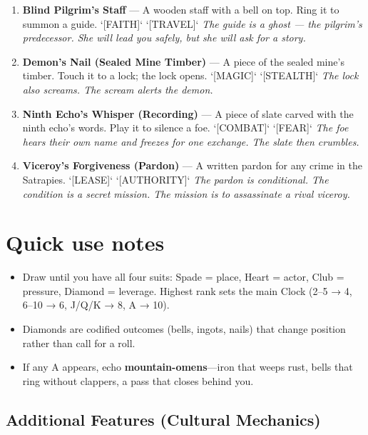 \begin{enumerate}
  \hfill \textit{The letter is written in blood. The blood is the viceroy's. He changes his blood type each season.}
\item[J] \textbf{Blind Pilgrim's Staff} --- A wooden staff with a bell on top. Ring it to summon a guide. `[FAITH]` `[TRAVEL]`
  \hfill \textit{The guide is a ghost — the pilgrim's predecessor. She will lead you safely, but she will ask for a story.}
\item[Q] \textbf{Demon's Nail (Sealed Mine Timber)} --- A piece of the sealed mine's timber. Touch it to a lock; the lock opens. `[MAGIC]` `[STEALTH]`
  \hfill \textit{The lock also screams. The scream alerts the demon.}
\item[K] \textbf{Ninth Echo's Whisper (Recording)} --- A piece of slate carved with the ninth echo's words. Play it to silence a foe. `[COMBAT]` `[FEAR]`
  \hfill \textit{The foe hears their own name and freezes for one exchange. The slate then crumbles.}
\item[A] \textbf{Viceroy's Forgiveness (Pardon)} --- A written pardon for any crime in the Satrapies. `[LEASE]` `[AUTHORITY]`
  \hfill \textit{The pardon is conditional. The condition is a secret mission. The mission is to assassinate a rival viceroy.}
\end{enumerate}

\section*{Quick use notes}
\label{sec:satrapies-quick-use}
\begin{itemize}
\item Draw until you have all four suits: Spade = place, Heart = actor, Club = pressure, Diamond = leverage. Highest rank sets the main Clock (2–5 → 4, 6–10 → 6, J/Q/K → 8, A → 10).
\item Diamonds are codified outcomes (bells, ingots, nails) that change position rather than call for a roll.
\item If any A appears, echo \textbf{mountain-omens}—iron that weeps rust, bells that ring without clappers, a pass that closes behind you.
\end{itemize}

\subsection*{Additional Features (Cultural Mechanics)}
\label{sec:satrapies-mechanics}

